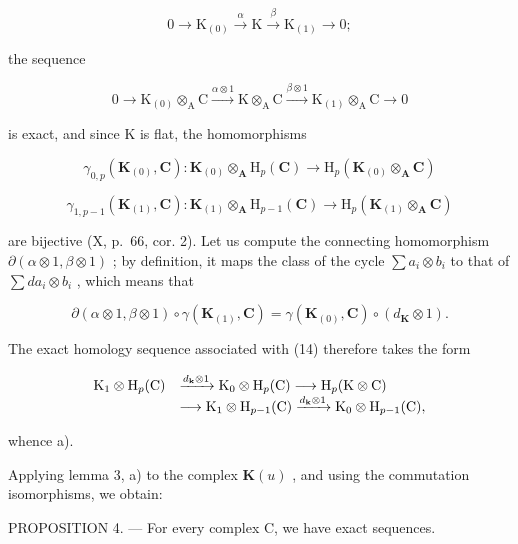 \[
0 \rightarrow \mathrm{K} _ {(0)} \xrightarrow {\alpha} \mathrm{K} \xrightarrow {\beta} \mathrm{K} _ {(1)} \rightarrow 0;
\]

the sequence

\[
0 \longrightarrow \mathrm{K} _ {(0)} \otimes_ {\mathrm{A}} \mathrm{C} \xrightarrow {\alpha \otimes 1} \mathrm{K} \otimes_ {\mathrm{A}} \mathrm{C} \xrightarrow {\beta \otimes 1} \mathrm{K} _ {(1)} \otimes_ {\mathrm{A}} \mathrm{C} \longrightarrow 0\tag{14}
\]

is exact, and since K is flat, the homomorphisms

\[
\gamma_ {0, p} (\mathbf {K} _ {(0)}, \mathbf {C}): \mathbf {K} _ {(0)} \otimes_ {\mathbf {A}} \mathrm{H} _ {p} (\mathbf {C}) \rightarrow \mathrm{H} _ {p} (\mathbf {K} _ {(0)} \otimes_ {\mathbf {A}} \mathbf {C})
\]

\[
\gamma_ {1, p - 1} (\mathbf {K} _ {(1)}, \mathbf {C}): \mathbf {K} _ {(1)} \otimes_ {\mathbf {A}} \mathrm{H} _ {p - 1} (\mathbf {C}) \rightarrow \mathrm{H} _ {p} (\mathbf {K} _ {(1)} \otimes_ {\mathbf {A}} \mathbf {C})
\]

are bijective (X, p.~66, cor. 2). Let us compute the connecting homomorphism \(\partial (\alpha \otimes 1, \beta \otimes 1)\) ; by definition, it maps the class of the cycle \(\sum a_i \otimes b_i\) to that of \(\sum da_i \otimes b_i\) , which means that

\[
\partial (\alpha \otimes 1, \beta \otimes 1) \circ \gamma (\mathbf {K} _ {(1)}, \mathbf {C}) = \gamma (\mathbf {K} _ {(0)}, \mathbf {C}) \circ (d _ {\mathbf {K}} \otimes 1).
\]

The exact homology sequence associated with (14) therefore takes the form

\[
\begin{array}{r l} \mathrm{K} _ {1} \otimes \mathrm{H} _ {p} (\mathrm{C}) & \xrightarrow {d _ {\mathbf {k}} \otimes 1} \mathrm{K} _ {0} \otimes \mathrm{H} _ {p} (\mathrm{C}) \longrightarrow \mathrm{H} _ {p} (\mathrm{K} \otimes \mathrm{C}) \\ & \longrightarrow \mathrm{K} _ {1} \otimes \mathrm{H} _ {p - 1} (\mathrm{C}) \xrightarrow {d _ {\mathbf {k}} \otimes 1} \mathrm{K} _ {0} \otimes \mathrm{H} _ {p - 1} (\mathrm{C}), \end{array}
\]

whence a).

Applying lemma 3, a) to the complex \(\mathbf{K}(u)\) , and using the commutation isomorphisms, we obtain:

PROPOSITION 4. --- For every complex C, we have exact sequences.

